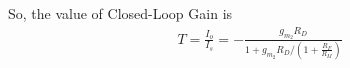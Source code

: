 \begin{enumerate}[label=\thesubsection.\arabic*.,ref=\thesubsection.\theenumi]
So, the value of Closed-Loop Gain is
\begin{align}
T = \frac{I_{o}}{I_{s}}=-\frac{g_{m_{2}} R_{D}}{1+g_{m_{2}} R_{D} /\left(1+\frac{R_{F}}{R_{M}}\right)}
\end{align}

\end{enumerate}
